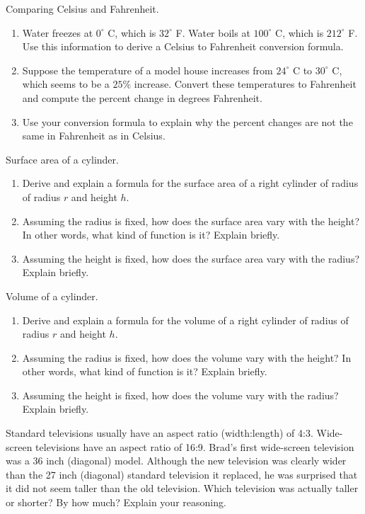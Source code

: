 \begin{prob}
Comparing Celsius and Fahrenheit.  
\begin{enumerate}
\item Water freezes at $0^\circ$ C, which is $32^\circ$ F.  Water boils at $100^\circ$ C, which is $212^\circ$ F.  Use this information to derive a Celsius to Fahrenheit conversion formula.  
\item Suppose the temperature of a model house increases from $24^\circ$ C to $30^\circ$ C, which seems to be a $25\%$ increase.  Convert these temperatures to Fahrenheit and compute the percent change in degrees Fahrenheit. 
\item Use your conversion formula to explain why the percent changes are not the same in Fahrenheit as in Celsius.  
\end{enumerate}
\end{prob}


\begin{prob}
Surface area of a cylinder.
\begin{enumerate}
\item Derive and explain a formula for the surface area of a right cylinder of radius of radius $r$ and height $h$.  
\item Assuming the radius is fixed, how does the surface area vary with the height?  In other words, what kind of function is it?  Explain briefly.  
\item Assuming the height is fixed, how does the surface area vary with the radius?  Explain briefly. 
\end{enumerate}
\end{prob}

\begin{prob}
Volume of a cylinder.
\begin{enumerate}
\item Derive and explain a formula for the volume of a right cylinder of radius of radius $r$ and height $h$.  
\item Assuming the radius is fixed, how does the volume vary with the height?  In other words, what kind of function is it?  Explain briefly.  
\item Assuming the height is fixed, how does the volume vary with the radius?  Explain briefly. 
\end{enumerate}
\end{prob}


\begin{prob}
Standard televisions usually have an aspect ratio (width:length) of 4:3.  Wide-screen televisions have an aspect ratio of 16:9.  Brad's first wide-screen television was a 36 inch (diagonal) model.  Although the new television was clearly wider than the 27 inch (diagonal) standard television it replaced, he was surprised that it did not seem taller than the old television.  Which television was actually taller or shorter?  By how much?  Explain your reasoning.   
\end{prob}

